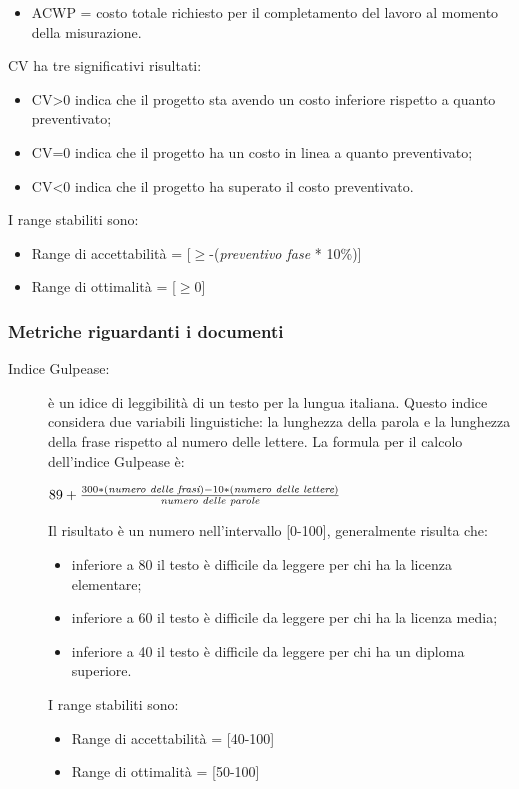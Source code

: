 \begin{description}
\begin{itemize}
        \item ACWP = costo totale richiesto per il completamento del lavoro al momento della misurazione.
      \end{itemize}
      CV ha tre significativi risultati:
      \begin{itemize}
        \item CV>0 indica che il progetto sta avendo un costo inferiore rispetto a quanto preventivato;
        \item CV=0 indica che il progetto ha un costo in linea a quanto preventivato;
        \item CV<0 indica che il progetto ha superato il costo preventivato.
      \end{itemize}
      I range stabiliti sono:
      \begin{itemize}
        \item Range di accettabilità = [\(\geq\)-(\emph{preventivo fase} * 10\%)]
        \item Range di ottimalità = [\(\geq\)0]
      \end{itemize}
    \end{description}
    \subsubsection{Metriche riguardanti i documenti}
    \begin{description}
      \item[Indice Gulpease:] è un idice di leggibilità di un testo per la lungua italiana.
      Questo indice considera due variabili linguistiche: la lunghezza della parola e la lunghezza della frase rispetto al numero delle lettere.
      La formula per il calcolo dell'indice Gulpease è:
      \begin{center}
        \( 89+\frac{300 * (\emph{numero delle frasi}) - 10 * (\emph{numero delle lettere})}{\emph{numero delle parole}} \)
      \end{center}
      Il risultato è un numero nell'intervallo [0-100], generalmente risulta che:
      \begin{itemize}
        \item inferiore a 80 il testo è difficile da leggere per chi ha la licenza elementare;
        \item inferiore a 60 il testo è difficile da leggere per chi ha la licenza media;
        \item inferiore a 40 il testo è difficile da leggere per chi ha un diploma superiore.
      \end{itemize}
      I range stabiliti sono:
      \begin{itemize}
        \item Range di accettabilità = [40-100]
        \item Range di ottimalità = [50-100]
      \end{itemize}
    \end{description}
